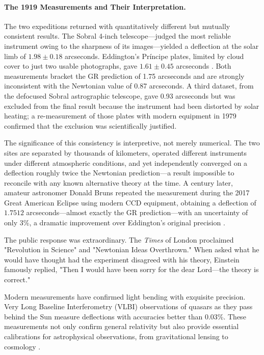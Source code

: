 \documentclass[12pt, a4paper]{article}
\begin{document}
	\paragraph{The 1919 Measurements and Their Interpretation.}
	The two expeditions returned with quantitatively different but mutually consistent results. The Sobral 4-inch telescope---judged the most reliable instrument owing to the sharpness of its images---yielded a deflection at the solar limb of $1.98 \pm 0.18$ arcseconds. Eddington's Príncipe plates, limited by cloud cover to just two usable photographs, gave $1.61 \pm 0.45$ arcseconds \citep{kennefickNoShadowDoubt2019}. Both measurements bracket the GR prediction of 1.75 arcseconds and are strongly inconsistent with the Newtonian value of 0.87 arcseconds. A third dataset, from the defocused Sobral astrographic telescope, gave 0.93 arcseconds but was excluded from the final result because the instrument had been distorted by solar heating; a re-measurement of those plates with modern equipment in 1979 confirmed that the exclusion was scientifically justified.
	
	The significance of this consistency is interpretive, not merely numerical. The two sites are separated by thousands of kilometers, operated different instruments under different atmospheric conditions, and yet independently converged on a deflection roughly twice the Newtonian prediction---a result impossible to reconcile with any known alternative theory at the time. A century later, amateur astronomer Donald Bruns repeated the measurement during the 2017 Great American Eclipse using modern CCD equipment, obtaining a deflection of $1.7512$ arcseconds---almost exactly the GR prediction---with an uncertainty of only 3\%, a dramatic improvement over Eddington's original precision \citep{kennefickNoShadowDoubt2019}.
	
	The public response was extraordinary. The \textit{Times} of London proclaimed "Revolution in Science" and "Newtonian Ideas Overthrown." When asked what he would have thought had the experiment disagreed with his theory, Einstein famously replied, "Then I would have been sorry for the dear Lord—the theory is correct."
	
	Modern measurements have confirmed light bending with exquisite precision. Very Long Baseline Interferometry (VLBI) observations of quasars as they pass behind the Sun measure deflections with accuracies better than 0.03\%. These measurements not only confirm general relativity but also provide essential calibrations for astrophysical observations, from gravitational lensing to cosmology \citep{willConfrontationGeneralRelativity2014}.
	
\end{document}
